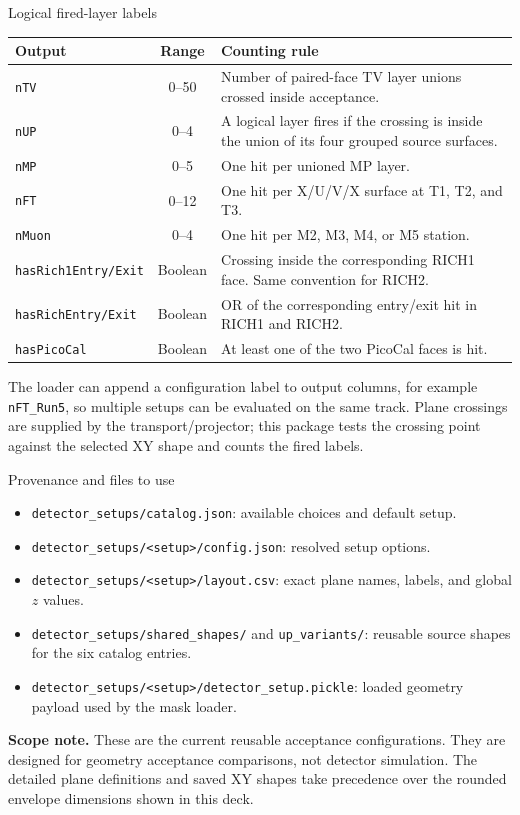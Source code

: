 \documentclass[aspectratio=169,10pt]{beamer}
\begin{document}
\begin{frame}{Logical fired-layer labels}
\small
\begin{tabularx}{\textwidth}{@{}l c X@{}}
\toprule
Output & Range & Counting rule \\
\midrule
\texttt{nTV} & 0--50 & Number of paired-face TV layer unions crossed inside acceptance. \\
\texttt{nUP} & 0--4 & A logical layer fires if the crossing is inside the union of its four grouped source surfaces. \\
\texttt{nMP} & 0--5 & One hit per unioned MP layer. \\
\texttt{nFT} & 0--12 & One hit per X/U/V/X surface at T1, T2, and T3. \\
\texttt{nMuon} & 0--4 & One hit per M2, M3, M4, or M5 station. \\
\texttt{hasRich1Entry/Exit} & Boolean & Crossing inside the corresponding RICH1 face. Same convention for RICH2. \\
\texttt{hasRichEntry/Exit} & Boolean & OR of the corresponding entry/exit hit in RICH1 and RICH2. \\
\texttt{hasPicoCal} & Boolean & At least one of the two PicoCal faces is hit. \\
\bottomrule
\end{tabularx}

\vspace{4mm}
The loader can append a configuration label to output columns, for example
\texttt{nFT\_Run5}, so multiple setups can be evaluated on the same track.
Plane crossings are supplied by the transport/projector; this package tests
the crossing point against the selected XY shape and counts the fired labels.
\end{frame}

\begin{frame}{Provenance and files to use}
\small
\begin{itemize}
  \item \texttt{detector\_setups/catalog.json}: available choices and default setup.
  \item \texttt{detector\_setups/<setup>/config.json}: resolved setup options.
  \item \texttt{detector\_setups/<setup>/layout.csv}: exact plane names, labels, and global $z$ values.
  \item \texttt{detector\_setups/shared\_shapes/} and \texttt{up\_variants/}: reusable source shapes for the six catalog entries.
  \item \texttt{detector\_setups/<setup>/detector\_setup.pickle}: loaded geometry payload used by the mask loader.
\end{itemize}

\vspace{3mm}
\textbf{Scope note.} These are the current reusable acceptance configurations.
They are designed for geometry acceptance comparisons, not detector simulation.
The detailed plane definitions and saved XY shapes take precedence over the
rounded envelope dimensions shown in this deck.
\end{frame}
\end{document}
